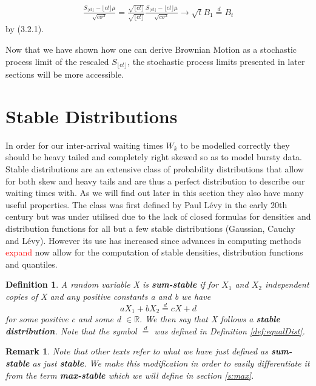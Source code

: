\documentclass[honours,12pt]{unswthesis}
\newcommand{\R}{\mathbb{R}}
\newcommand{\1}{\mathbf 1}
\newtheorem{definition}[equation]{Definition}
\newtheorem{remark}[equation]{Remark}
\numberwithin{equation}{section}
\theoremstyle{definition}
\theoremstyle{remark}
\begin{document}

\begin{align*}
\frac{S_{\lfloor ct \rfloor} - \lfloor ct \rfloor\mu}{\sqrt{c \sigma^2}}
= \frac{\sqrt{\lfloor ct \rfloor}}{\sqrt{\lfloor ct \rfloor}}
\frac{S_{\lfloor ct \rfloor} - \lfloor ct \rfloor\mu}{\sqrt{c \sigma^2}}
\to \sqrt t B_1 \stackrel{d}{=} B_t
\end{align*}
by (3.2.1). 


Now that we have shown how one can derive Brownian Motion as a stochastic process limit of the rescaled $S_{\lfloor ct\rfloor}$, the stochastic process limits presented in later sections will be more accessible.


\section{Stable Distributions}
In order for our inter-arrival waiting times $W_k$ to be modelled correctly they should be heavy tailed and completely right skewed so as to model bursty data.
Stable distributions are an extensive class of probability distributions that allow for both skew and heavy tails and are thus a perfect distribution to describe our waiting times with. As we will find out later in this section they also have many useful properties. The class was first defined by Paul L\'{e}vy in the early 20th century but was under utilised due to the lack of closed formulas for densities and distribution functions for all but a few stable distributions (Gaussian, Cauchy and L\'{e}vy). However its use has increased since advances in computing methods \textcolor{red}{expand} now allow for the computation of stable densities, distribution functions and quantiles.\\
\begin{definition}\cite{Nolan2015}
A random variable X is \textbf{sum-stable} if for $X_1$ and $X_2$ independent copies of X and any positive constants a and b we have
\[
	aX_1+bX_2\overset{d}{=}cX+d
\]
for some positive c and some d $\in\R.$ We then say that X follows a \textbf{stable distribution}. Note that the symbol $\overset{d}{=}$ was defined in Definition \ref{def:equalDist}.\\
\end{definition}
\begin{remark}
Note that other texts refer to what we have just defined as \textbf{sum-stable} as just \textbf{stable}. We make this modification in order to easily differentiate it from the term \textbf{max-stable} which we will define in section \ref{s:max}.\\
\end{remark}
\end{document}
